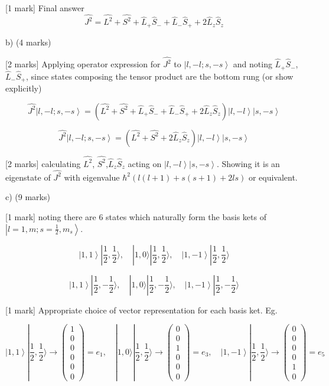[1 mark] Final answer \[ \hat{J^{2}} =  \hat{L^{2}} + \hat{S^{2}} + \hat{L}_{+}\hat{S}_{-} +  \hat{L}_{-}\hat{S}_{+} + 2\hat{L}_{z}\hat{S}_{z} \]

b) (4 marks)

[2 marks] Applying operator expression for \( \hat{J^{2}} \) to \( \left|l, -l; s, -s \right> \) and noting \( \hat{L}_{+}\hat{S}_{-} \), \( \hat{L}_{-}\hat{S}_{+} \), since states composing the tensor product are the bottom rung (or show explicitly)

\[ 
\hat{J^{2}}\left|l, -l; s, -s \right> = \left( \hat{L^{2}} + \hat{S^{2}} + \hat{L}_{+}\hat{S}_{-} +  \hat{L}_{-}\hat{S}_{+} + 2\hat{L}_{z}\hat{S}_{z} \right) \left|l, -l \right> \left|s, -s \right>  
\]

\[
\hat{J^{2}}\left|l, -l; s, -s \right> = \left( \hat{L^{2}} + \hat{S^{2}} + 2\hat{L}_{z}\hat{S}_{z} \right)  \left|l, -l \right> \left|s, -s \right>
\]

[2 marks] calculating \( \hat{L^{2}} \), \( \hat{S^{2}} \),\( \hat{L}_{z}\hat{S}_{z} \) acting on \( \left|l, -l \right> \left|s, -s \right> \). Showing it is an eigenstate of  \( \hat{J^{2}} \) with eigenvalue \( \hbar^2 \left ( l(l+1) + s(s+1) + 2ls \right ) \) or equivalent. 

c) (9 marks)

[1 mark] noting there are 6 states which naturally form the basis kets of \( \left|l=1, m; s=\frac{1}{2}, m_{s} \right> \).

\[ \left|1, 1 \right> |\frac{1}{2},\frac{1}{2} \rangle, \quad |1, 0 \rangle |\frac{1}{2}, \frac{1}{2} \rangle, \quad \left|1, -1 \right>|\frac{1}{2}, \frac{1}{2} \rangle \]

\[ \left|1, 1 \right> |\frac{1}{2},-\frac{1}{2} \rangle, \quad |1, 0 \rangle |\frac{1}{2}, -\frac{1}{2} \rangle, \quad \left|1, -1 \right>|\frac{1}{2}, -\frac{1}{2} \rangle \]

[1 mark] Appropriate choice of vector representation for each basis ket. Eg. 

\[
 \left|1, 1 \right> |\frac{1}{2},\frac{1}{2} \rangle \rightarrow \begin{pmatrix} 1\\ 0\\ 0\\ 0\\ 0\\ 0 \end{pmatrix} = e_1, \quad |1, 0 \rangle |\frac{1}{2}, \frac{1}{2} \rangle \rightarrow \begin{pmatrix} 0\\ 0\\ 1\\ 0\\ 0\\ 0 \end{pmatrix} = e_3, \quad \left|1, -1 \right>|\frac{1}{2}, \frac{1}{2} \rangle \rightarrow \begin{pmatrix} 0\\ 0\\ 0\\ 0\\ 1\\ 0 \end{pmatrix} = e_5
\]

